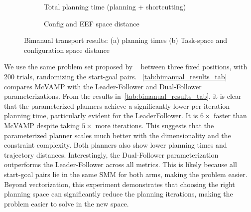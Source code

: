 \documentclass[letterpaper, 10 pt, conference]{ieeeconf}
\begin{document}
\begin{figure}[h]
\centering
\begin{subfigure}[b]{0.75\linewidth}
    \centering
    
    \caption{Total planning time (planning + shortcutting)}
    \vspace{0.5em}
    \label{fig:bimanual_time}
\end{subfigure}

\begin{subfigure}[b]{0.85\linewidth}
    \centering
    
    \caption{Config and EEF space distance}
    \label{fig:bimanual_distance}
\end{subfigure}
\caption{Bimanual transport results: (a) planning times (b) Task-space and configuration space distance }

\label{fig:bimanual_results}
\vspace{-1em}
\end{figure}




We use the same problem set proposed by ~\cite{cohn2024constrained} between three fixed positions, with 200 trials, randomizing the start-goal pairs. ~\cref{tab:bimanual_results_tab} compares McVAMP with the Leader-Follower and Dual-Follower parameterizations. From the results in~\cref{tab:bimanual_results_tab}, it is clear that the parameterized planners achieve a significantly lower per-iteration planning time, particularly evident for the LeaderFollower. It is $6\times$ faster than McVAMP despite taking $5\times$ more iterations. This suggests that the parameterized planner scales much better with the dimensionality and the constraint complexity. Both planners also show lower planning times and trajectory distances. 
Interestingly, the Dual-Follower parameterization outperforms the Leader-Follower across all metrics. This is likely because all start-goal pairs lie in the same SMM for both arms, making the problem easier. Beyond vectorization, this experiment demonstrates that choosing the right planning space can significantly reduce the planning iterations, making the problem easier to solve in the new space.
\end{document}
